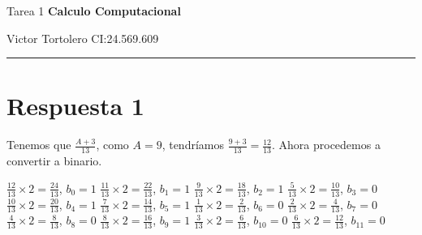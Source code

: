 \documentclass{article}
\begin{document}
\flushleft
\setlength{\parindent}{20pt}

\justify
\centerline{\huge Tarea 1 \textbf{Calculo Computacional}}
\centerline{Victor Tortolero CI:24.569.609}  %
\hrule

\section*{Respuesta 1}
Tenemos que $\frac{A + 3}{13}$, como $A = 9$, tendríamos $\frac{9 + 3}{13} = \frac{12}{13}$.
Ahora procedemos a convertir a binario. \newline
\begin{multicols}{2}
	$\frac{12}{13} \times 2 = \frac{24}{13}$, $b_{0} = 1$ \newline
	$\frac{11}{13} \times 2 = \frac{22}{13}$, $b_{1} = 1$ \newline
	$\frac{9}{13} \times 2 = \frac{18}{13}$, $b_{2} = 1$ \newline
	$\frac{5}{13} \times 2 = \frac{10}{13}$, $b_{3} = 0$ \newline
	$\frac{10}{13} \times 2 = \frac{20}{13}$, $b_{4} = 1$ \newline
	$\frac{7}{13} \times 2 = \frac{14}{13}$, $b_{5} = 1$ \newline
	$\frac{1}{13} \times 2 = \frac{2}{13}$, $b_{6} = 0$ \newline
	$\frac{2}{13} \times 2 = \frac{4}{13}$, $b_{7} = 0$ \newline
	$\frac{4}{13} \times 2 = \frac{8}{13}$, $b_{8} = 0$ \newline
	$\frac{8}{13} \times 2 = \frac{16}{13}$, $b_{9} = 1$ \newline
	$\frac{3}{13} \times 2 = \frac{6}{13}$, $b_{10} = 0$ \newline
	$\frac{6}{13} \times 2 = \frac{12}{13}$, $b_{11} = 0$ \newline
\end{multicols}
\end{document}
